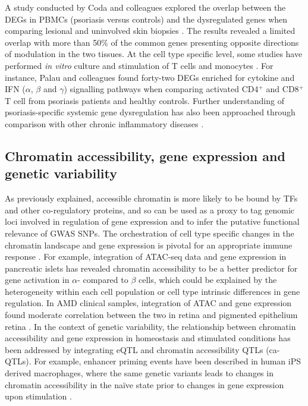 A study conducted by Coda and colleagues explored the overlap between the DEGs in PBMCs (psoriasis versus controls) and the dysregulated genes when comparing lesional and uninvolved skin biopsies \parencite{Coda2012}. The results revealed a limited overlap with more than 50\% of the common genes presenting opposite directions of modulation in the two tissues. At the cell type specific level, some studies have performed \textit{in vitro} culture and stimulation of T cells and monocytes \parencite{Palau2013, Jung2004}. For instance, Palau and colleagues found forty-two DEGs enriched for cytokine and IFN ($\alpha$, $\beta$ and $\gamma$) signalling pathways when comparing activated CD4$^+$ and CD8$^+$ T cell from psoriasis patients and healthy controls. Further understanding of psoriasis-specific systemic gene dysregulation has also been approached through comparison with other chronic inflammatory diseases \parencite{Mesko2015}. %


\subsection{Chromatin accessibility, gene expression and genetic variability}
As previously explained, accessible chromatin is more likely to be bound by TFs and other co-regulatory proteins, and so can be used as a proxy to tag genomic loci involved in regulation of gene expression and to infer the putative functional relevance of GWAS SNPs. The orchestration of cell type specific changes in the chromatin landscape and gene expression is pivotal for an appropriate immune response \parencite{Goodnow2005}. For example, integration of ATAC-seq data and gene expression in pancreatic islets has revealed chromatin accessibility to be a better predictor for gene activation in $\alpha$- compared to $\beta$ cells, which could be explained by the heterogeneity within each cell population or cell type intrinsic differences in gene regulation. In AMD clinical samples, integration of ATAC and gene expression found moderate correlation between the two in retina and pigmented epithelium retina \parencite{Wang2018}. In the context of genetic variability, the relationship between chromatin accessibility and gene expression in homeostasis and stimulated conditions has been addressed by integrating eQTL and chromatin accessibility QTLs (ca-QTLs). For example, enhancer priming events have been described in human iPS derived macrophages, where the same genetic variants leads to changes in chromatin accessibility in the na\"{i}ve state prior to changes in gene expression upon stimulation \parencite{Alasoo2018}. 


